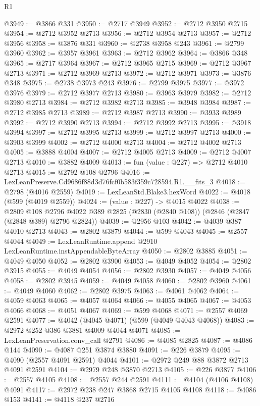 \begin{lexlean}{R1}
\begin{coremodule}
@3949 := @3866 @331
@3950 := @2717 @3949
@3952 := @2712 @3950 @2715
@3954 := @2712 @3952 @2713
@3956 := @2712 @3954 @2713
@3957 := @2712 @3956
@3958 := @3876 @331
@3960 := @2738 @3958 @243
@3961 := @2799 @3960
@3962 := @3957 @3961
@3963 := @2712 @3962
@3964 := @3866 @348
@3965 := @2717 @3964
@3967 := @2712 @3965 @2715
@3969 := @2712 @3967 @2713
@3971 := @2712 @3969 @2713
@3972 := @2712 @3971
@3973 := @3876 @348
@3975 := @2738 @3973 @243
@3976 := @2799 @3975
@3977 := @3972 @3976
@3979 := @2712 @3977 @2713
@3980 := @3963 @3979
@3982 := @2712 @3980 @2713
@3984 := @2712 @3982 @2713
@3985 := @3948 @3984
@3987 := @2712 @3985 @2713
@3989 := @2712 @3987 @2713
@3990 := @3933 @3989
@3992 := @2712 @3990 @2713
@3994 := @2712 @3992 @2713
@3995 := @3918 @3994
@3997 := @2712 @3995 @2713
@3999 := @2712 @3997 @2713
@4000 := @3903 @3999
@4002 := @2712 @4000 @2713
@4004 := @2712 @4002 @2713
@4005 := @3888 @4004
@4007 := @2712 @4005 @2713
@4009 := @2712 @4007 @2713
@4010 := @3882 @4009
@4013 := fun (value : @227) => @2712 @4010 @2713
@4015 := @2792 @108 @2796
@4016 := LexLeanPreserve.Cd9686f88d3d76fcf0b583f359c728594.R1.__fits_3
@4018 := @2798 (@4016 @2559)
@4019 := LexLeanStd.Blake3.hexWord
@4022 := @4018 (@599 (@4019 @2559))
@4024 := (value : @227) -> @4015 @4022
@4038 := @2809
    @108
    @2796
    @4022
    @389
    @2825
    (@2830 (@2840 @108))
    (@2846 (@2847 (@2848 @389) @2796 @2824))
@4039 := @2956 @103
@4042 := @4039 @387 @4010 @2713
@4043 := @2802 @3879
@4044 := @599 @4043
@4045 := @2557 @4044
@4049 := LexLeanRuntime.append @2910 LexLeanRuntime.instAppendableByteArray
@4050 := @2802 @3885
@4051 := @4049 @4050
@4052 := @2802 @3900
@4053 := @4049 @4052
@4054 := @2802 @3915
@4055 := @4049 @4054
@4056 := @2802 @3930
@4057 := @4049 @4056
@4058 := @2802 @3945
@4059 := @4049 @4058
@4060 := @2802 @3960
@4061 := @4049 @4060
@4062 := @2802 @3975
@4063 := @4061 @4062
@4064 := @4059 @4063
@4065 := @4057 @4064
@4066 := @4055 @4065
@4067 := @4053 @4066
@4068 := @4051 @4067
@4069 := @599 @4068
@4071 := @2557 @4069 @2591
@4077 := @4042 (@4045 @4071) (@599 (@4049 @4043 @4068))
@4083 := @2972 @252 @386 @3881 @4009 @4044 @4071
@4085 := LexLeanPreservation.conv_call @2791
@4086 := @4085 @2825
@4087 := @4086 @144
@4090 := @4087 @251 @3874 @3880
@4091 := @226 @3879
@4095 := @4090 (@2557 @4091 @2591) @4044
@4101 := @2972 @249 @88 @3872 @2713 @4091 @2591
@4104 := @2979 @248 @3870 @2713
@4105 := @226 @3877
@4106 := @2557 @4105
@4108 := @2557 @244 @2591
@4111 := @4104 (@4106 @4108) @4091
@4117 := @2972 @238 @247 @3868 @2715 @4105 @4108
@4118 := @4086 @153
@4141 := @4118
    @237
    @2716

\end{coremodule}
\end{lexlean}
